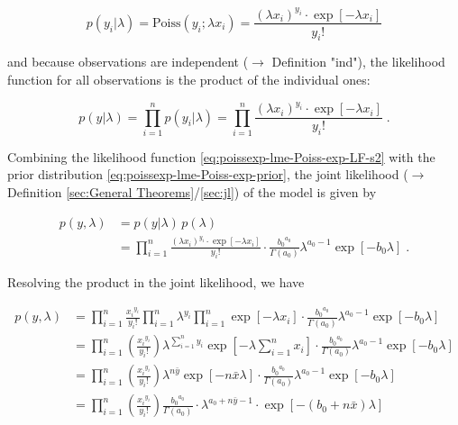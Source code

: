 \documentclass[a4paper,12pt]{book}
\begin{document}
\begin{equation} \label{eq:poissexp-lme-Poiss-exp-LF-s1}
p(y_i|\lambda) = \mathrm{Poiss}(y_i; \lambda x_i) = \frac{(\lambda x_i)^{y_i} \cdot \exp\left[-\lambda x_i\right]}{y_i !}
\end{equation}

and because observations are independent ($\rightarrow$ Definition "ind"), the likelihood function for all observations is the product of the individual ones:

\begin{equation} \label{eq:poissexp-lme-Poiss-exp-LF-s2}
p(y|\lambda) = \prod_{i=1}^n p(y_i|\lambda) = \prod_{i=1}^n \frac{(\lambda x_i)^{y_i} \cdot \exp\left[-\lambda x_i\right]}{y_i !} \; .
\end{equation}

Combining the likelihood function \eqref{eq:poissexp-lme-Poiss-exp-LF-s2} with the prior distribution \eqref{eq:poissexp-lme-Poiss-exp-prior}, the joint likelihood ($\rightarrow$ Definition \ref{sec:General Theorems}/\ref{sec:jl}) of the model is given by

\begin{equation} \label{eq:poissexp-lme-Poiss-exp-JL-s1}
\begin{split}
p(y,\lambda) &= p(y|\lambda) \, p(\lambda) \\
&= \prod_{i=1}^n \frac{(\lambda x_i)^{y_i} \cdot \exp\left[-\lambda x_i\right]}{y_i !} \cdot \frac{ {b_0}^{a_0}}{\Gamma(a_0)} \lambda^{a_0-1} \exp[-b_0 \lambda] \; .
\end{split}
\end{equation}

Resolving the product in the joint likelihood, we have

\begin{equation} \label{eq:poissexp-lme-Poiss-exp-JL-s2}
\begin{split}
p(y,\lambda) &= \prod_{i=1}^n \frac{ {x_i}^{y_i}}{y_i !} \prod_{i=1}^n \lambda^{y_i} \prod_{i=1}^n \exp\left[-\lambda x_i\right] \cdot \frac{ {b_0}^{a_0}}{\Gamma(a_0)} \lambda^{a_0-1} \exp[-b_0 \lambda] \\
&= \prod_{i=1}^n \left(\frac{ {x_i}^{y_i}}{y_i !}\right) \lambda^{\sum_{i=1}^n y_i} \exp\left[-\lambda \sum_{i=1}^n x_i\right] \cdot \frac{ {b_0}^{a_0}}{\Gamma(a_0)} \lambda^{a_0-1} \exp[-b_0 \lambda] \\
&= \prod_{i=1}^n \left(\frac{ {x_i}^{y_i}}{y_i !}\right) \lambda^{n \bar{y}} \exp\left[-n \bar{x} \lambda\right] \cdot \frac{ {b_0}^{a_0}}{\Gamma(a_0)} \lambda^{a_0-1} \exp[-b_0 \lambda] \\
&= \prod_{i=1}^n \left(\frac{ {x_i}^{y_i}}{y_i !}\right) \frac{ {b_0}^{a_0}}{\Gamma(a_0)}  \cdot \lambda^{a_0 + n \bar{y} - 1} \cdot \exp\left[-(b_0 + n \bar{x}) \lambda\right] \\
\end{split}
\end{equation}
\end{document}
